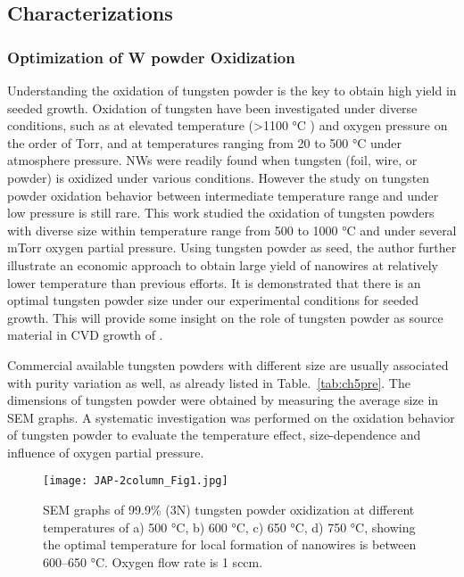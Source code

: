 \subsection{Characterizations}

\subsubsection{Optimization of W powder Oxidization}\label{sec:woxd}

Understanding the oxidation of tungsten powder is the key to obtain high yield in seeded growth. Oxidation of tungsten have been investigated under diverse conditions, such as at elevated temperature (\textgreater 1100 \si{\degreeCelsius} ) and oxygen pressure on the order of Torr,\cite{Base1965} and at temperatures ranging from 20 to 500 \si{\degreeCelsius} under atmosphere pressure.\cite{Warren1996}  NWs were readily found when tungsten (foil, wire, or powder) is oxidized under various conditions.\cite{Zhu1999,Karuppanan2007,Hsieh2010} However the study on tungsten powder oxidation behavior between intermediate temperature range and under low pressure is still rare. This work studied the oxidation of tungsten powders with diverse size within temperature range from 500 to 1000 \si{\degreeCelsius} and under several mTorr oxygen partial pressure. Using tungsten powder as seed, the author further illustrate an economic approach to obtain large yield of  nanowires at relatively lower temperature than previous efforts. It is demonstrated that there is an optimal tungsten powder size under our experimental conditions for seeded growth. This will provide some insight on the role of tungsten powder as source material in CVD growth of .

Commercial available tungsten powders with different size are usually associated with purity variation as well, as already listed in Table.~\ref{tab:ch5pre}. The dimensions of tungsten powder were obtained by measuring the average size in SEM graphs. A systematic investigation was performed on the oxidation behavior of tungsten powder to evaluate the temperature effect, size-dependence and influence of oxygen partial pressure.
\begin{figure}[htb]
\centering
\texttt{[image: JAP-2column\_Fig1.jpg]}
\caption[W powder oxidation: temperature effect]{SEM graphs of 99.9\% (3N) tungsten powder oxidization at different temperatures of a) 500 \si{\degreeCelsius}, b) 600 \si{\degreeCelsius}, c) 650 \si{\degreeCelsius}, d) 750 \si{\degreeCelsius}, showing the optimal temperature for local formation of nanowires is between 600--650 \si{\degreeCelsius}. Oxygen flow rate is 1 sccm.}
\label{fig:pdtemp}
\end{figure}

